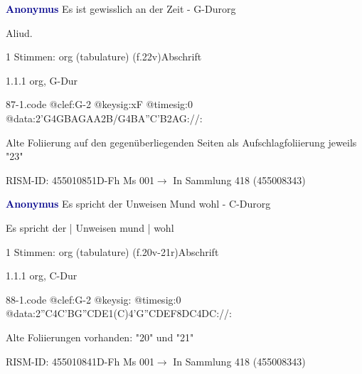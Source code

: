 \documentclass[twocolumn, 12pt]{book}
\begin{document}
\par \vspace{16pt} \textcolor{darkblue}{\textbf{Anonymus  }}\hfillplus{\textbf{[87]}}\newline Es ist gewisslich an der Zeit - G-Dur\newline org
\par \begin{itshape}[f.22v, at left:] Aliud.\end{itshape} 
\par \textcolor{darkblue}{}  1 Stimmen: org (tabulature)  (f.22v)\newline Abschrift
\par 1.1.1  org, G-Dur  
\begin{filecontents*}{87-1.code}
@clef:G-2
@keysig:xF
@timesig:0
@data:2'G4GBAGAA2B/G4BA''C'B2AG://:
\end{filecontents*}
\newline %
\par Alte Foliierung auf den gegenüberliegenden Seiten als Aufschlagfoliierung jeweils "23"
\par RISM-ID: 455010851\newline D-Fh  Ms 001\newline $\rightarrow$ In Sammlung 418 (455008343)
      
\par \vspace{16pt} \textcolor{darkblue}{\textbf{Anonymus  }}\hfillplus{\textbf{[88]}}\newline Es spricht der Unweisen Mund wohl - C-Dur\newline org
\par \begin{itshape}[f.20v, at left:] Es spricht der | Unweisen mund | wohl\end{itshape} 
\par \textcolor{darkblue}{}  1 Stimmen: org (tabulature)  (f.20v-21r)\newline Abschrift
\par 1.1.1  org, C-Dur  
\begin{filecontents*}{88-1.code}
@clef:G-2
@keysig:
@timesig:0
@data:2''C4C'BG''CDE1(C)4'G''CDEF{8DC}4DC://:
\end{filecontents*}
\newline %
\par Alte Foliierungen vorhanden: "20" und "21"
\par RISM-ID: 455010841\newline D-Fh  Ms 001\newline $\rightarrow$ In Sammlung 418 (455008343)
      
\end{document}
